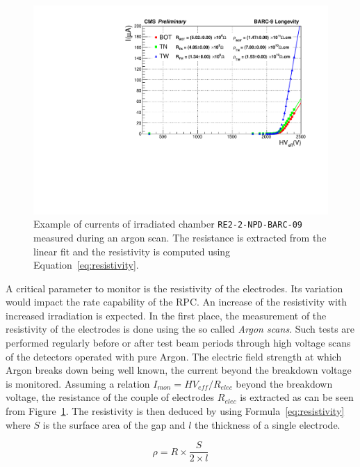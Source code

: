 	\begin{figure}
		\centering
    	\includegraphics[width = \linewidth]{fig/chapt5/Argon-Scan.pdf}
		\caption{\label{fig:argon-scan} Example of currents of irradiated chamber \texttt{RE2-2-NPD-BARC-09} measured during an argon scan. The resistance is extracted from the linear fit and the resistivity is computed using Equation~\ref{eq:resistivity}.}
	\end{figure}
	
	A critical parameter to monitor is the resistivity of the electrodes. Its variation would impact the rate capability of the RPC. An increase of the resistivity with increased irradiation is expected. In the first place, the measurement of the resistivity of the electrodes is done using the so called \textit{Argon scans}. Such tests are performed regularly before or after test beam periods through high voltage scans of the detectors operated with pure Argon. The electric field strength at which Argon breaks down being well known, the current beyond the breakdown voltage is monitored. Assuming a relation $I_{mon} = HV_{eff}/R_{elec}$ beyond the breakdown voltage,  the resistance of the couple of electrodes $R_{elec}$ is extracted as can be seen from Figure~\ref{fig:argon-scan}. The resistivity is then deduced by using Formula~\ref{eq:resistivity} where $S$ is the surface area of the gap and $l$ the thickness of a single electrode.
	
\endgroup
	
	\begin{equation}
	\label{eq:resistivity}
	\rho = R \times \frac{S}{2 \times l}
	\end{equation}
	
